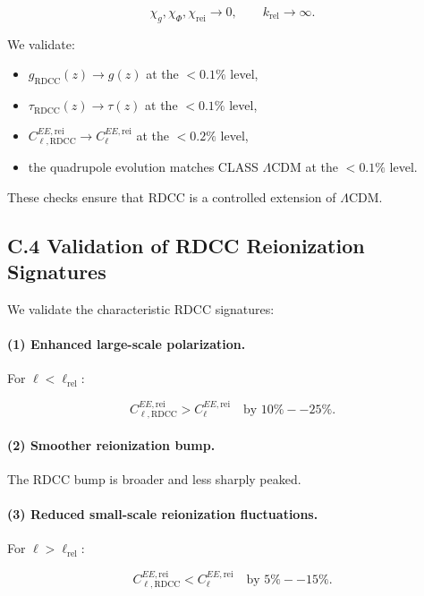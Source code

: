 \documentclass[11pt,a4paper]{article}
\begin{document}
\[
\chi_{g},\chi_{\Phi},\chi_{\mathrm{rei}} \rightarrow 0,
\qquad
k_{\mathrm{rel}} \rightarrow \infty.
\]



We validate:
\begin{itemize}
\item $g_{\mathrm{RDCC}}(z) \rightarrow g(z)$ at the $<0.1\%$ level,
\item $\tau_{\mathrm{RDCC}}(z) \rightarrow \tau(z)$ at the $<0.1\%$ level,
\item $C_{\ell,\mathrm{RDCC}}^{EE,\mathrm{rei}} \rightarrow C_{\ell}^{EE,\mathrm{rei}}$ at the $<0.2\%$ level,
\item the quadrupole evolution matches CLASS $\Lambda$CDM at the $<0.1\%$ level.
\end{itemize}

These checks ensure that RDCC is a controlled extension of $\Lambda$CDM.

\subsection*{C.4 Validation of RDCC Reionization Signatures}

We validate the characteristic RDCC signatures:

\paragraph{(1) Enhanced large-scale polarization.}
For $\ell < \ell_{\mathrm{rel}}$:


\[
C_{\ell,\mathrm{RDCC}}^{EE,\mathrm{rei}}
>
C_{\ell}^{EE,\mathrm{rei}}
\quad \text{by } 10\%--25\%.
\]



\paragraph{(2) Smoother reionization bump.}
The RDCC bump is broader and less sharply peaked.

\paragraph{(3) Reduced small-scale reionization fluctuations.}
For $\ell > \ell_{\mathrm{rel}}$:


\[
C_{\ell,\mathrm{RDCC}}^{EE,\mathrm{rei}}
<
C_{\ell}^{EE,\mathrm{rei}}
\quad \text{by } 5\%--15\%.
\]
\end{document}
